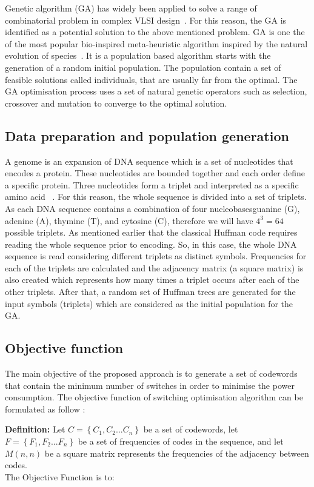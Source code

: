 \documentclass[preprint,12pt]{elsarticle}
\begin{document}
Genetic algorithm (GA) has widely been applied to solve a range of combinatorial problem in complex VLSI design~\cite{chan1991macro,bright1996genetic,cohoon1987genetic}. For this reason, the GA is identified as a potential solution to the above mentioned problem. GA is one the of the most popular bio-inspired meta-heuristic algorithm inspired by the natural evolution of species~\cite{gen1}. It is a population based algorithm starts with the generation of a random initial population. The population contain a set of feasible solutions called individuals, that are usually far from the optimal. The GA optimisation process uses a set of natural genetic operators such as selection, crossover and mutation to converge to the optimal solution.
\subsection{ Data preparation and population generation}
A genome is an expansion of DNA sequence which is a set of nucleotides that encodes a protein. These nucleotides are bounded together and each order define a specific protein. Three nucleotides form a triplet and interpreted as a specific amino acid ~\cite{Harvey00}. For this reason, the whole sequence is divided into a set of triplets.  As each DNA sequence contains a combination of four nucleobases\textemdash guanine (G), adenine (A), thymine (T), and cytosine (C), therefore we will have $4^3=64$ possible triplets. As mentioned earlier that the classical Huffman code requires reading the whole sequence prior to encoding. So, in this case, the whole DNA sequence is read considering different triplets as distinct symbols. Frequencies for each of the triplets are calculated and  the adjacency matrix (a square matrix) is also created which represents how many times a triplet occurs after each of the other triplets.  After that, a random set of Huffman trees are generated for the input symbols (triplets) which are considered as the initial population for the GA.
\subsection{Objective function}

The main objective of the proposed approach is to generate a set of codewords that contain the minimum number of switches in order to minimise the power consumption. The objective function of switching optimisation algorithm can be formulated as follow :

\textbf{Definition:} Let $C=\left\{C_{1},C_{2}...C_{n}\right\}$ be a set of codewords, let $F=\left\{F_{1},F_{2}...F_{n}\right\}$ be a set of frequencies of codes in the sequence, and let $M(n,n)$ be a square matrix represents the frequencies of the adjacency between codes.
\\
The Objective Function is to: 
\end{document}
